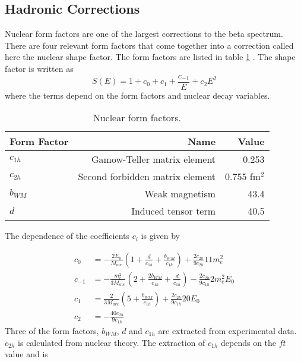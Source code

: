 \documentclass[../MaxHughesThesis.tex]{subfiles}
\begin{document}
\subsection{Hadronic Corrections}

Nuclear form factors are one of the largest corrections to the beta spectrum.
There are four relevant form factors that come together into a correction called here the nuclear shape factor.
The form factors are listed in table \ref{tab:formfact} \cite{Min11} \cite{Cal77}.
The shape factor is written as 
\begin{equation}
	\label{eq:shapefactor}
	S(E) = 1 + c_{0} + c_{1} + \frac{c_{-1}}{E} + c_{2}E^{2}	
\end{equation}
where the terms depend on the form factors and nuclear decay variables.
\begin{table}[!hbt]
	\centering
	\caption{Nuclear form factors.}
		\begin{tabular}{lrr}
		Form Factor & Name & Value \\ \hline
		$c_{1h}$ & Gamow-Teller matrix element & 0.253  \\
		$c_{2h}$ & Second forbidden matrix element & 0.755 fm$^{2}$  \\
		$b_{WM}$ & Weak magnetism & 43.4   \\
		$d$ & Induced tensor term & 40.5 
		\end{tabular}
	\label{tab:formfact}
\end{table}
The dependence of the coefficients $c_{i}$ is given by\cite{Cal77}

\begin{equation}
	\label{eq:sfcs}
	\begin{split}
	c_{0} & = -\frac{2 E_{0}}{M_{ave}}(1 + \frac{d}{c_{1h}} + \frac{b_{WM}}{c_{1h}})  + \frac{2 c_{2h}}{9 c_{2h}} 11 m_{e}^{2} \\
	c_{-1} & = -\frac{m_{e}^{2}}{3M_{ave}} (2 + \frac{2b_{WM}}{c_{1h}} + \frac{d}{c_{1h}})  - \frac{2 c_{2h}}{9 c_{1h}} 2 m_{e}^{2} E_{0}\\
	c_{1} & =  \frac{2}{3M_{ave}} (5 + \frac{b_{WM}}{c_{1h}}) + \frac{2 c_{2h}}{9 c_{1h}} 20 E_{0} \\
	c_{2} & = -\frac{40 c_{2h}}{9 c_{1h}} 
	\end{split}
\end{equation}
Three of the form factors, $b_{WM}$, $d$ and $c_{1h}$ are extracted from experimental data. 
$c_{2h}$ is calculated from nuclear theory. 
The extraction of $c_{1h}$ depends on the $ft$ value and is \cite{Min11}
\end{document}

